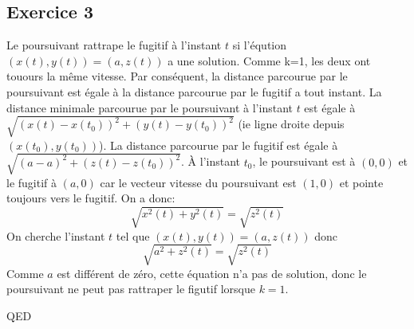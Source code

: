 \documentclass[]{book}
\theoremstyle{definition}
\begin{document}
\subsection*{Exercice 3}
Le poursuivant rattrape le fugitif à l'instant $t$ si l'\'eqution $(x(t), y(t)) = (a, z(t))$ a une solution. Comme k=1, les deux ont touours la m\^eme vitesse. Par cons\'equent, la distance parcourue par le poursuivant est \'egale \`a la distance parcourue par le fugitif a tout instant. La distance minimale parcourue par le poursuivant \`a l'instant $t$ est \'egale \`a $\sqrt{(x(t)-x(t_0))^2 + (y(t)-y(t_0))^2}$ (ie ligne droite depuis $(x(t_0), y(t_0))$). La distance parcourue par le fugitif est \'egale \`a $\sqrt{(a-a)^2+(z(t)-z(t_0))^2}$. \`A l'instant $t_0$, le poursuivant est \`a $(0,0)$ et le fugitif \`a $(a,0)$ car le vecteur vitesse du poursuivant est $(1,0)$ et pointe toujours vers le fugitif. On a donc:
$$
\sqrt{x^2(t) + y^2(t)} = \sqrt{z^2(t)}
$$
On cherche l'instant $t$ tel que $(x(t), y(t)) = (a, z(t))$ donc
$$
\sqrt{a^2 + z^2(t)} = \sqrt{z^2(t)}
$$
Comme $a$ est diff\'erent de z\'ero, cette \'equation n'a pas de solution, donc le poursuivant ne peut pas rattraper le figutif lorsque $k=1$.


QED
\end{document}
